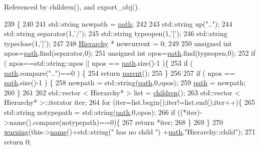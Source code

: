 Referenced by children(), and export\+\_\+obj().


\begin{DoxyCode}
239                                               \{
240 
241   std::string newpath = \hyperlink{classHierarchy_aa7990fa7caf132d83e361ce033c6c65a}{path};
242 
243   std::string up(\textcolor{stringliteral}{".."});
244   std::string separator(1,\textcolor{charliteral}{'/'});
245   std::string typeopen(1,\textcolor{charliteral}{'['});
246   std::string typeclose(1,\textcolor{charliteral}{']'});
247 
248   \hyperlink{classHierarchy}{Hierarchy} * newcurrent = 0;
249 
250   \textcolor{keywordtype}{unsigned} \textcolor{keywordtype}{int} npos=\hyperlink{classHierarchy_aa7990fa7caf132d83e361ce033c6c65a}{path}.find(separator,0);
251   \textcolor{keywordtype}{unsigned} \textcolor{keywordtype}{int} opos=\hyperlink{classHierarchy_aa7990fa7caf132d83e361ce033c6c65a}{path}.find(typeopen,0);
252   \textcolor{keywordflow}{if} ( npos==std::string::npos || npos == \hyperlink{classHierarchy_aa7990fa7caf132d83e361ce033c6c65a}{path}.size()-1 )\{
253     \textcolor{keywordflow}{if} ( \hyperlink{classHierarchy_aa7990fa7caf132d83e361ce033c6c65a}{path}.compare(\textcolor{stringliteral}{".."})==0 ) \{
254       \textcolor{keywordflow}{return} \hyperlink{classHierarchy_a1c7bec8257e717f9c1465e06ebf845fc}{parent}();
255     \}
256 
257     \textcolor{keywordflow}{if} ( npos == \hyperlink{classHierarchy_aa7990fa7caf132d83e361ce033c6c65a}{path}.size()-1 ) \{
258       newpath = std::string(\hyperlink{classHierarchy_aa7990fa7caf132d83e361ce033c6c65a}{path},0,opos);
259       \hyperlink{classHierarchy_aa7990fa7caf132d83e361ce033c6c65a}{path} = newpath;
260     \}
261 
262     std::vector < Hierarchy* > list = \hyperlink{classHierarchy_aa9a76f69e98e052ee1a6e32cea006288}{children}();
263     std::vector < Hierarchy* >::iterator iter;
264     \textcolor{keywordflow}{for} (iter=list.begin();iter!=list.end();iter++)\{
265       std::string notypepath = std::string(\hyperlink{classHierarchy_aa7990fa7caf132d83e361ce033c6c65a}{path},0,opos);
266       \textcolor{keywordflow}{if} ((*iter)->name().compare(notypepath)==0)\{
267         \textcolor{keywordflow}{return} *iter;
268       \}
269     \}
270     \hyperlink{classObject_a65cd4fda577711660821fd2cd5a3b4c9}{warning}(this->\hyperlink{classObject_a300f4c05dd468c7bb8b3c968868443c1}{name}()+std::string(\textcolor{stringliteral}{" has no child "}) +\hyperlink{classHierarchy_aa7990fa7caf132d83e361ce033c6c65a}{path},\textcolor{stringliteral}{"Hierarchy::child"});
271     \textcolor{keywordflow}{return} 0;

\end{DoxyCode}
